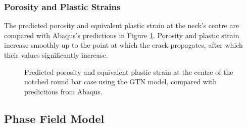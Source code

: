 \documentclass[sn-mathphys,Numbered]{sn-jnl}%
\begin{document}
\subsubsection{Porosity and Plastic Strains}
The predicted porosity and equivalent plastic strain at the neck's centre are compared with Abaqus's predictions in Figure \ref{fig:axi_GTN_pointResults}.
Porosity and plastic strain increase smoothly up to the point at which the crack propagates, after which their values significantly increase.
\begin{figure}[htb]
	\centering
		\caption{Predicted porosity and equivalent plastic strain at the centre of the notched round bar case using the GTN model, compared with predictions from Abaqus.}
	\label{fig:axi_GTN_pointResults}
\end{figure}




\subsection{Phase Field Model}

\end{document}
